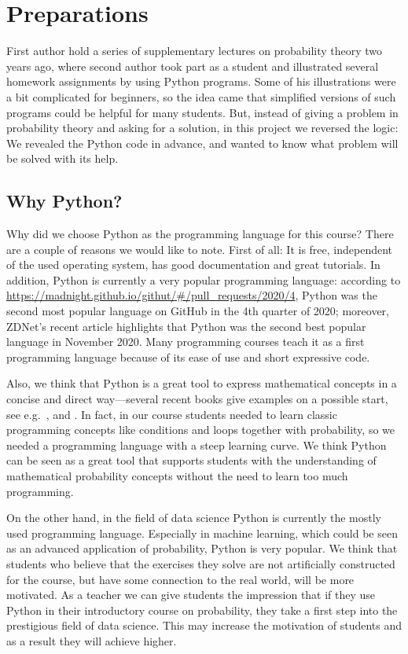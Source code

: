 \documentclass[]{interact}
\theoremstyle{plain}%
\theoremstyle{definition}
\theoremstyle{remark}
\begin{document}
\section{Preparations}
\label{preps}

First author hold a series of supplementary lectures on probability theory two years ago, where second author
took part as a student and illustrated several homework assignments by using Python programs.
Some of his illustrations were a bit complicated for beginners, so the idea came that
simplified versions of such programs could be helpful for many students.
But, instead of giving a problem in probability theory and asking for a solution, in this
project we reversed the logic: We revealed the Python code in advance, and wanted to know
what problem will be solved with its help.

\subsection{Why Python?}

Why did we choose Python as the programming language for this course?
There are a couple of reasons we would like to note. First of all: It is
free, independent of the used operating system, has good documentation
and great tutorials. In addition, Python is currently a very popular
programming language: according to
\url{https://madnight.github.io/githut/#/pull_requests/2020/4}, Python
was the second most popular language on GitHub in the 4th quarter of 2020;
moreover, ZDNet's recent article \cite{LiamTung2020} highlights that Python
was the second best popular language in November 2020.
Many programming courses teach it as a first
programming language because of its ease of use and short expressive
code.

Also, we think that Python is a great tool to express mathematical
concepts in a concise and direct way---several recent books give
examples on a possible start, see e.g.~\cite{Fuhrer2016}, \cite{Mehta2015} and \cite{Stewart2014}.
In fact, in our course students
needed to learn classic programming concepts like conditions and loops
together with probability, so we needed a programming language with a
steep learning curve. We think Python can be seen as a great tool that
supports students with the understanding of mathematical probability
concepts without the need to learn too much programming.

On the other hand, in the field of data science
Python is currently the mostly used programming language. Especially in
machine learning, which could be seen as an advanced application of
probability, Python is very popular. We think that students who believe
that the exercises they solve are not artificially constructed for the
course, but have some connection to the real world, will be more
motivated. As a teacher we can give students the impression that if they
use Python in their introductory course on probability, they take a first
step into the prestigious field of data science. This may increase the
motivation of students and as a result they will achieve higher.
\end{document}
